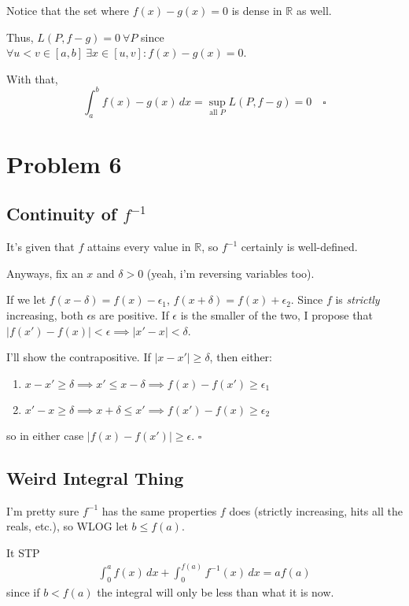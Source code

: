 \documentclass[12pt]{article}
\newcommand{\R}{\mathbb{R}}
\begin{document}
Notice that the set where $f(x)-g(x)=0$ is dense in $\R$ as well.

Thus, $L(P, f-g)=0\ \forall P$ since $\forall u < v \in [a, b]\ \exists x \in [u, v]: f(x)-g(x)=0$.

With that,
\[\int_{a}^{b} f(x)-g(x)\,dx=\sup_{\text{all }P} L(P, f-g)=0\quad\square\]

\section{Problem 6}

\subsection{Continuity of \texorpdfstring{$f^{-1}$}{f inverse}}

It's given that $f$ attains every value in $\R$, so $f^{-1}$ certainly is well-defined.

Anyways, fix an $x$ and $\delta > 0$ (yeah, i'm reversing variables too).

If we let $f(x-\delta)=f(x)-\epsilon_1$, $f(x+\delta)=f(x)+\epsilon_2$.
Since $f$ is \textit{strictly} increasing, both $\epsilon$s are positive.
If $\epsilon$ is the smaller of the two, I propose that
$|f(x')-f(x)| < \epsilon \implies|x'-x| < \delta$.

I'll show the contrapositive.
If $|x-x'| \ge \delta$, then either:
\begin{enumerate}[nolistsep]
  \item $x-x' \ge \delta \implies x' \le x-\delta \implies f(x)-f(x') \ge \epsilon_1$
  \item $x'-x \ge \delta \implies x+\delta \le x' \implies f(x')-f(x) \ge \epsilon_2$
\end{enumerate}
so in either case $|f(x)-f(x')| \ge \epsilon$. $\square$

\pagebreak

\subsection{Weird Integral Thing}

I'm pretty sure $f^{-1}$ has the same properties $f$ does (strictly increasing, hits all the reals, etc.),
so WLOG let $b \le f(a)$.

It STP
\begin{gather}
  \label{inteq} \int_{0}^{a} f(x)\,dx + \int_{0}^{f(a)} f^{-1}(x)\,dx = af(a)
\end{gather}
since if $b < f(a)$ the integral will only be less than what it is now.
\end{document}
